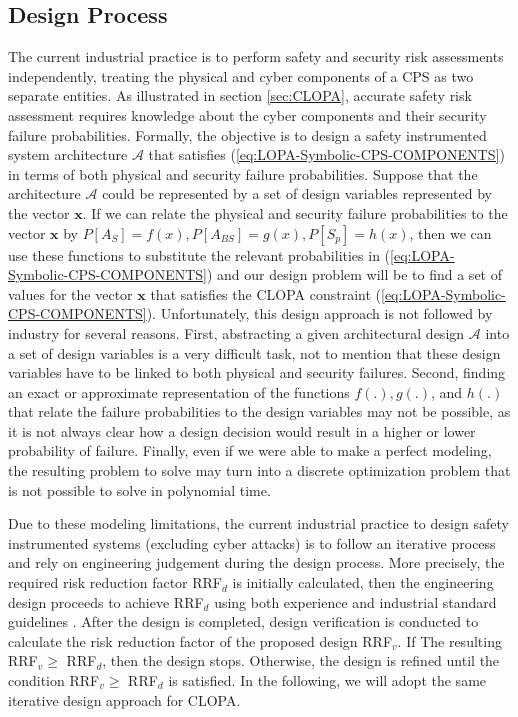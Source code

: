 \documentclass[journal]{IEEEtran}
\begin{document}
\subsection{Design Process}
The current industrial practice is to perform safety and security risk assessments independently, treating the physical and cyber components of a CPS as two separate entities. As illustrated in section \ref{sec:CLOPA}, accurate safety risk assessment requires knowledge about the cyber components and their security failure probabilities. Formally, the objective is to design a safety instrumented system architecture $\mathcal{A}$ that satisfies (\ref{eq:LOPA-Symbolic-CPS-COMPONENTS}) in terms of both physical and security failure probabilities. Suppose that the architecture $\mathcal{A}$ could be represented by a set of design variables represented by the vector $\mathbf{x}$. If we can relate the physical and security failure probabilities to the vector $\mathbf{x}$ by $P[A_S] = f(x), P[A_{BS}] = g(x), P[S_p] = h(x)$, then we can use these functions to substitute the relevant probabilities in (\ref{eq:LOPA-Symbolic-CPS-COMPONENTS}) and our design problem will be to find a set of values for the vector $\mathbf{x}$ that satisfies the CLOPA constraint (\ref{eq:LOPA-Symbolic-CPS-COMPONENTS}). Unfortunately, this design approach is not followed by industry for several reasons. First, abstracting a given architectural design $\mathcal{A}$ into a set of design variables is a very difficult task, not to mention that these design variables have to be linked to both physical and security failures. Second, finding an exact or approximate representation of the functions $f(.), g(.)$, and $h(.)$ that relate the failure probabilities to the design variables may not be possible, as it is not always clear how a design decision would result in a higher or lower probability of failure. Finally, even if we were able to make a perfect modeling, the resulting problem to solve may turn into a discrete optimization problem that is not possible to solve in polynomial time.

Due to these modeling limitations, the current industrial practice to design safety instrumented systems (excluding cyber attacks) is to follow an iterative process and rely on engineering judgement during the design process. More precisely, the required risk reduction factor RRF$_d$ is initially calculated, then the engineering design proceeds to achieve RRF$_d$ using both experience and industrial standard guidelines \cite{IEC61511}. After the design is completed, design verification is conducted to calculate the risk reduction factor of the proposed design RRF$_v$. If The resulting RRF$_v \geq$ RRF$_d$, then the design stops. Otherwise, the design is refined until the condition RRF$_v \geq$ RRF$_d$ is satisfied. In the following, we will adopt the same iterative design approach for CLOPA.
\end{document}
